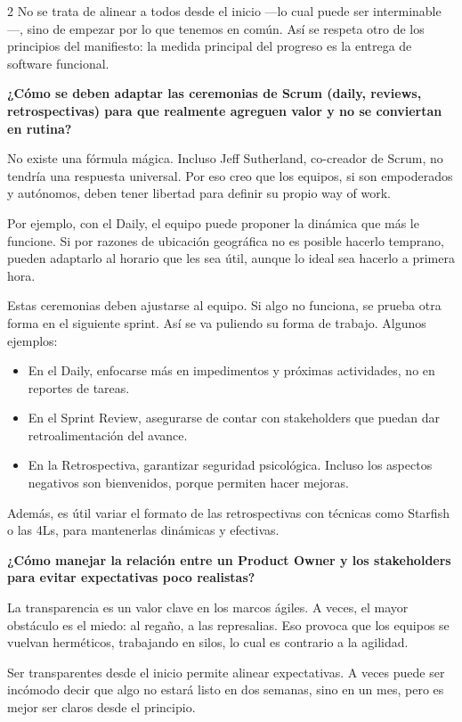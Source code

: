 \documentclass[12pt,spanish,Letterpaper,openany]{book}
\providecommand{\tightlist}{%
  \setlength{\itemsep}{0pt}\setlength{\parskip}{0pt}}
\begin{document}
\begin {multicols}{2}
No se trata de alinear a todos desde el inicio ---lo cual puede ser interminable---, sino de empezar por lo que tenemos en común. Así se respeta otro de los principios del manifiesto: la medida principal del progreso es la entrega de software funcional.

\textbf{¿Cómo se deben adaptar las ceremonias de Scrum (daily, reviews, retrospectivas) para que realmente agreguen valor y no se conviertan en rutina?}

No existe una fórmula mágica. Incluso Jeff Sutherland, co-creador de Scrum, no tendría una respuesta universal. Por eso creo que los equipos, si son empoderados y autónomos, deben tener libertad para definir su propio way of work.

Por ejemplo, con el Daily, el equipo puede proponer la dinámica que más le funcione. Si por razones de ubicación geográfica no es posible hacerlo temprano, pueden adaptarlo al horario que les sea útil, aunque lo ideal sea hacerlo a primera hora.

Estas ceremonias deben ajustarse al equipo. Si algo no funciona, se prueba otra forma en el siguiente sprint. Así se va puliendo su forma de trabajo.
Algunos ejemplos:

\begin{itemize}
\tightlist
\item
  En el Daily, enfocarse más en impedimentos y próximas actividades, no en reportes de tareas.
\item
  En el Sprint Review, asegurarse de contar con stakeholders que puedan dar retroalimentación del avance.
\item
  En la Retrospectiva, garantizar seguridad psicológica. Incluso los aspectos negativos son bienvenidos, porque permiten hacer mejoras.
\end{itemize}

Además, es útil variar el formato de las retrospectivas con técnicas como Starfish o las 4Ls, para mantenerlas dinámicas y efectivas.

\textbf{¿Cómo manejar la relación entre un Product Owner y los stakeholders para evitar expectativas poco realistas?}

La transparencia es un valor clave en los marcos ágiles.
A veces, el mayor obstáculo es el miedo: al regaño, a las represalias. Eso provoca que los equipos se vuelvan herméticos, trabajando en silos, lo cual es contrario a la agilidad.

Ser transparentes desde el inicio permite alinear expectativas. A veces puede ser incómodo decir que algo no estará listo en dos semanas, sino en un mes, pero es mejor ser claros desde el principio.


\end{multicols}
\end{document}

